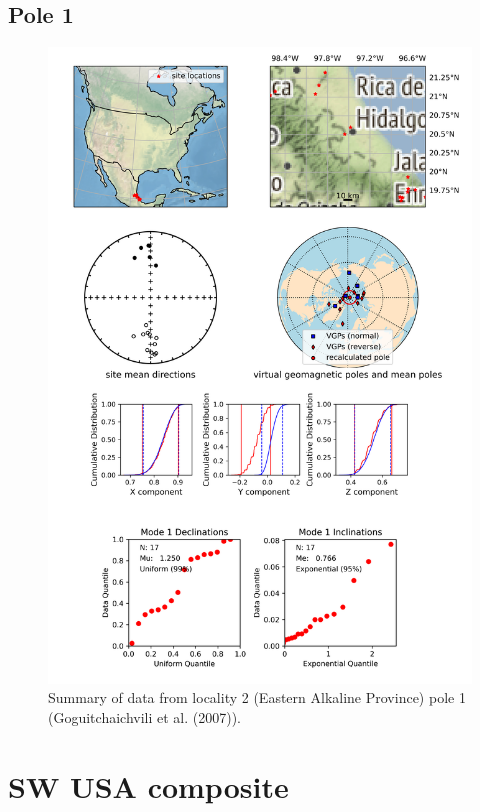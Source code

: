\subsection{Pole 1}


\begin{figure}[H]
\centering
\includegraphics[width=5 in]{./2/1/pole_summary.png}
\caption{Summary of data from locality 2 (Eastern Alkaline Province) pole 1 (Goguitchaichvili et al. (2007)).}
\end{figure}

\section{SW USA composite}
